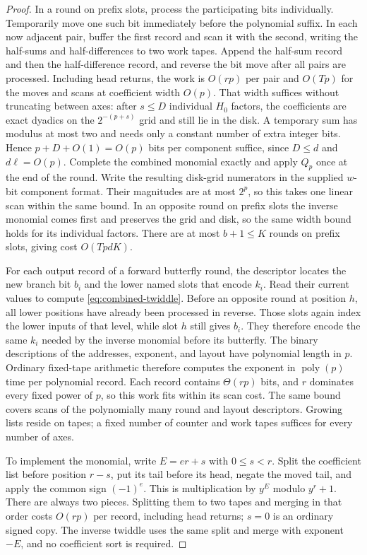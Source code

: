 \begin{proof}
In a round on prefix slots, process the participating bits individually.
Temporarily move one such bit immediately before the polynomial
suffix.  In each now adjacent pair, buffer the first record and scan
it with the second, writing the half-sums and half-differences to two
work tapes.  Append the half-sum record and then the half-difference
record, and reverse the bit move after
all pairs are processed.  Including head returns, the work is
$O(rp)$ per pair and $O(Tp)$ for the moves and scans at coefficient
width $O(p)$.
That width suffices without truncating between axes: after $s\leq D$
individual $H_0$ factors, the coefficients are exact dyadics on the
$2^{-(p+s)}$ grid and still lie in the disk.  A temporary sum has
modulus at most two and needs only a constant number of extra integer
bits.  Hence
$p+D+O(1)=O(p)$ bits per component suffice, since $D\leq d$ and
$d\ell=O(p)$.  Complete the combined monomial exactly and apply
$Q_p$ once at the end of the round. Write the resulting disk-grid
numerators in the supplied $w$-bit component format. Their magnitudes
are at most $2^p$, so this takes one linear scan within the same bound.
In an opposite round on prefix slots the
inverse monomial comes first and preserves the grid and disk, so the
same width bound holds for its individual factors.  There are at
most $b+1\leq K$ rounds on prefix slots, giving cost $O(TpdK)$.

For each output record of a forward butterfly round, the descriptor
locates the new branch bit $b_i$ and the lower named slots that encode
$k_i$.  Read their current values to compute
\eqref{eq:combined-twiddle}.  Before an opposite round at position
$h$, all lower positions have already been processed in reverse.
Those slots again index the lower inputs of that level, while slot
$h$ still gives $b_i$.  They therefore encode the same $k_i$ needed
by the inverse monomial before its
butterfly.  The binary descriptions of the addresses, exponent, and
layout have polynomial length in $p$.  Ordinary
fixed-tape arithmetic therefore computes the exponent in
$\operatorname{poly}(p)$ time per polynomial record.  Each record
contains $\Theta(rp)$ bits, and $r$ dominates every fixed power of
$p$, so this work fits within its scan cost.  The same bound covers
scans of the polynomially many round and layout descriptors.
Growing lists reside on tapes; a fixed number of counter and work
tapes suffices for every number of axes.

To implement the monomial, write $E=er+s$ with $0\leq s<r$.
Split the coefficient list before position $r-s$, put its tail
before its head, negate the moved tail, and apply the common sign
$(-1)^e$.  This is multiplication by $y^E$ modulo $y^r+1$.
There are always two pieces.  Splitting them to two tapes and merging
in that order costs $O(rp)$ per record, including head returns;
$s=0$ is an ordinary signed copy.  The inverse twiddle uses the
same split and merge with exponent $-E$, and no coefficient sort is
required.


\end{proof}
